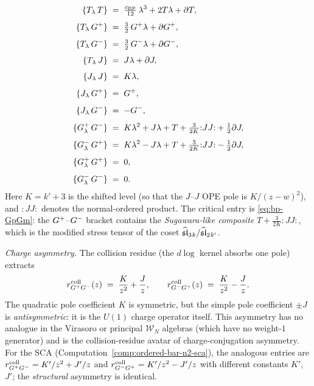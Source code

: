 \begin{computation}[The ordered bar complex of the
Bershadsky--Polyakov algebra
$\mathcal{B}^{k'} = W_{k'}(\mathfrak{sl}_3,f_{\min})$;
\ClaimStatusProvedHere]
\begin{align}
\{T_\lambda\, T\}
&\;=\;
\tfrac{c_{\mathrm{BP}}}{12}\,\lambda^3
+ 2T\lambda + \partial T,
\label{eq:bp-TT}
\\[4pt]
\{T_\lambda\, G^+\}
&\;=\;
\tfrac{3}{2}\,G^+\lambda + \partial G^+,
\label{eq:bp-TGp}
\\[4pt]
\{T_\lambda\, G^-\}
&\;=\;
\tfrac{3}{2}\,G^-\lambda + \partial G^-,
\label{eq:bp-TGm}
\\[4pt]
\{T_\lambda\, J\}
&\;=\;
J\lambda + \partial J,
\label{eq:bp-TJ}
\\[4pt]
\{J_\lambda\, J\}
&\;=\;
K\lambda,
\label{eq:bp-JJ}
\\[4pt]
\{J_\lambda\, G^+\}
&\;=\;
G^+,
\label{eq:bp-JGp}
\\[4pt]
\{J_\lambda\, G^-\}
&\;=\;
-G^-,
\label{eq:bp-JGm}
\\[4pt]
\{G^+_\lambda\, G^-\}
&\;=\;
K\lambda^2 + J\lambda
+ T + \tfrac{3}{2K}{:}JJ{:} + \tfrac{1}{2}\partial J,
\label{eq:bp-GpGm}
\\[4pt]
\{G^-_\lambda\, G^+\}
&\;=\;
K\lambda^2 - J\lambda
+ T + \tfrac{3}{2K}{:}JJ{:} - \tfrac{1}{2}\partial J,
\label{eq:bp-GmGp}
\\[4pt]
\{G^+_\lambda\, G^+\}
&\;=\; 0,
\label{eq:bp-GpGp}
\\[4pt]
\{G^-_\lambda\, G^-\}
&\;=\; 0.
\label{eq:bp-GmGm}
\end{align}
Here $K=k'+3$ is the shifted level
(so that the $J$--$J$ OPE pole is $K/(z-w)^2$),
and ${:}JJ{:}$ denotes the normal-ordered product.
The critical entry is
\eqref{eq:bp-GpGm}:
the $G^+$--$G^-$ bracket contains the
\emph{Sugawara-like composite} $T+\frac{3}{2K}{:}JJ{:}$, which
is the modified stress tensor of the coset
$\widehat{\mathfrak{sl}}_3{}_k / \widehat{\mathfrak{sl}}_2{}_{k'}$.

\emph{Charge asymmetry.}
The collision residue (the $d\log$ kernel absorbs
one pole) extracts
\begin{equation}\label{eq:bp-collision-residue-asymmetry}
r^{\mathrm{coll}}_{G^+G^-}(z)
\;=\;
\frac{K}{z^2} + \frac{J}{z},
\qquad
r^{\mathrm{coll}}_{G^-G^+}(z)
\;=\;
\frac{K}{z^2} - \frac{J}{z}.
\end{equation}
The quadratic pole coefficient $K$ is symmetric, but the
simple pole coefficient $\pm J$ is \emph{antisymmetric}:
it is the $U(1)$ charge operator itself. This asymmetry
has no analogue in the Virasoro or principal $\mathcal{W}_N$
algebras (which have no weight-$1$ generator) and is the
collision-residue avatar of charge-conjugation asymmetry.
For the SCA (Computation~\ref{comp:ordered-bar-n2-sca}),
the analogous entries are
$r^{\mathrm{coll}}_{G^+G^-}=K'/z^2+J'/z$ and
$r^{\mathrm{coll}}_{G^-G^+}=K'/z^2-J'/z$ with
different constants $K'$, $J'$; the \emph{structural}
asymmetry is identical.


\end{computation}
